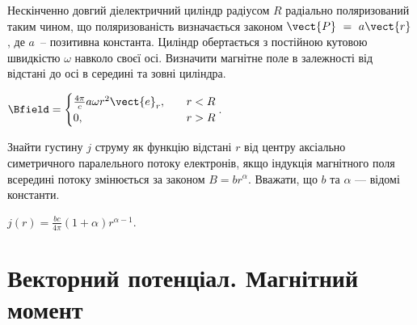 \begin{problem}%
Нескінченно довгий діелектричний циліндр радіусом $R$ радіально поляризований таким чином, що поляризованість визначається законом $\vect{P}~=~a \vect{r}$, де $a$~-- позитивна константа. Циліндр обертається з постійною кутовою швидкістю $\omega$ навколо своєї осі. Визначити магнітне поле в залежності від відстані до осі в середині та зовні циліндра.
\begin{solution}
	$\Bfield = %
		\begin{cases}
			\frac{4\pi}{c} a \omega r^2 \vect{e}_r, & \quad r < R \\
			0,                                      & \quad r > R
		\end{cases}
	$.
\end{solution}
\end{problem}



\begin{problem}%
    Знайти густину $j$ струму як функцію відстані $r$ від центру
аксіально симетричного паралельного потоку електронів, якщо індукція магнітного поля всередині потоку змінюється
за законом $B = br^{\alpha}$. Вважати, що $b$ та $\alpha$ --- відомі константи.
\begin{solution}
$j(r) = \frac{bc}{4\pi}(1 + \alpha)r^{\alpha-1}$.
\end{solution}
\end{problem}


\section{Векторний потенціал. Магнітний момент}


